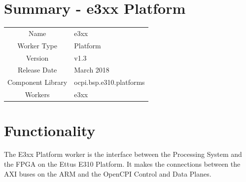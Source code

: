 \documentclass{article}
\author{} %
\date{Version \docVersion} %
\title{\docTitle}
\def\docVersion{1.3}
\def\comp{e3xx}
\def\Comp{e3xx Platform}
\begin{document}
\section*{Summary - \Comp}
\begin{tabular}{|c|M{13.5cm}|}
	\hline
	                  &                                                    \\
	\hline
	Name              & \comp                                              \\
	\hline
	Worker Type       & Platform                                           \\
	\hline
	Version           & v\docVersion \\
	\hline
	Release Date      & March 2018 \\
	\hline
	Component Library & ocpi.bsp.e310.platforms                                \\
	\hline
	Workers & \comp                                        \\
	\hline
\end{tabular}

\section*{Functionality}
\begin{flushleft}
The E3xx Platform worker is the interface between the Processing System and the FPGA on the Ettus E310 Platform. It makes the connections between the AXI buses on the ARM and the OpenCPI Control and Data Planes. 

\end{flushleft}
\end{document}
